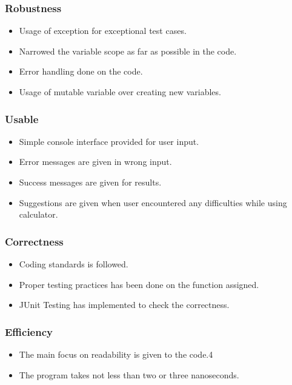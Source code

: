 \documentclass[a4paper,12pt]{article}
\begin{document}
   
    \subsubsection{Robustness}
        \begin{itemize}
            \item Usage of exception for exceptional test cases.
            \item Narrowed the variable scope as far as possible in the code.
            \item Error handling done on the code.
            \item Usage of mutable variable over creating new variables.
        \end{itemize}
  
    
    \subsubsection{Usable}
        \begin{itemize}
            \item Simple console interface provided for user input.
            \item Error messages are given in wrong input.
            \item Success messages are given for results.
            \item Suggestions are given when user encountered any difficulties while using calculator.
        \end{itemize}
        
    \subsubsection{Correctness}
        \begin{itemize}
            \item Coding standards is followed.
            \item Proper testing practices has been done on the function assigned. 
            \item JUnit Testing has implemented to check the correctness. 
        \end{itemize}
    
   
    \subsubsection{Efficiency}
    \begin{itemize}
        \item The main focus on readability is given to the code.4
        \item The program takes not less than two or three nanoseconds.
    \end{itemize}
    
\end{document}
